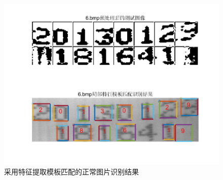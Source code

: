 \documentclass[cn]{elegantbook}
\begin{document}
\begin{figure}[!h]
\begin{minipage}[t]{0.48\textwidth}
	\end{minipage}
	\begin{minipage}[t]{0.48\textwidth}
		\centering
		\includegraphics[width=\textwidth]{save26}
	\end{minipage}
	\caption{\label{feat2}采用特征提取模板匹配的正常图片识别结果}
\end{figure}
\end{document}
